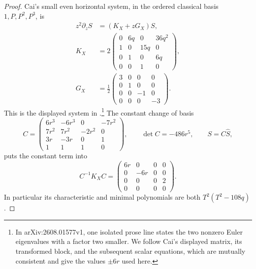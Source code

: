 \begin{proof}
Cai's small even horizontal system, in the ordered classical basis
\(1,P,P^2,P^3\), is
\begin{equation}\label{eq:cubic-small-even-connection}
 \begin{aligned}
 z^2\partial_zS&=(K_X+zG_X)S,\\
 K_X&=2\begin{pmatrix}
 0&6q&0&36q^2\\
 1&0&15q&0\\
 0&1&0&6q\\
 0&0&1&0
 \end{pmatrix},\\
 G_X&=\frac12\begin{pmatrix}
 3&0&0&0\\0&1&0&0\\0&0&-1&0\\0&0&0&-3
 \end{pmatrix}.
 \end{aligned}
\end{equation}
This is the displayed system in \cite[Section~3, p.~4]{Cai}.\footnote{In
arXiv:2608.01577v1, one isolated prose line states the two nonzero Euler
eigenvalues with a factor two smaller.  We follow Cai's displayed matrix,
its transformed block, and the subsequent scalar equations, which are
mutually consistent and give the values $\pm6r$ used here.}  The constant
change of basis
\begin{equation}\label{eq:cubic-constant-block-basis}
 C=\begin{pmatrix}
 6r^3&-6r^3&0&-7r^2\\
 7r^2&7r^2&-2r^2&0\\
 3r&-3r&0&1\\
 1&1&1&0
 \end{pmatrix},\qquad
 \det C=-486r^5,\qquad S=C\widehat S,
\end{equation}
puts the constant term into
\begin{equation}\label{eq:cubic-constant-block-form}
 C^{-1}K_XC=
 \begin{pmatrix}
 6r&0&0&0\\
 0&-6r&0&0\\
 0&0&0&2\\
 0&0&0&0
 \end{pmatrix}.
\end{equation}
In particular its characteristic and minimal polynomials are both
\(T^2(T^2-108q)\).


\end{proof}
